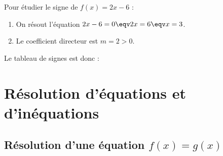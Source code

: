 \begin{methode}
	Pour étudier le signe de $f(x) = 2x - 6$ :
	\begin{enumerate}
		\item On résout l'équation $2x - 6 = 0 \eqv 2x = 6 \eqv x = 3$.
		\item Le coefficient directeur est $m = 2 > 0$.
	\end{enumerate}
	Le tableau de signes est donc :
	\begin{center}
	\end{center}
\end{methode}

\section{Résolution d'équations et d'inéquations}

\subsection{Résolution d'une équation $f(x) = g(x)$}

